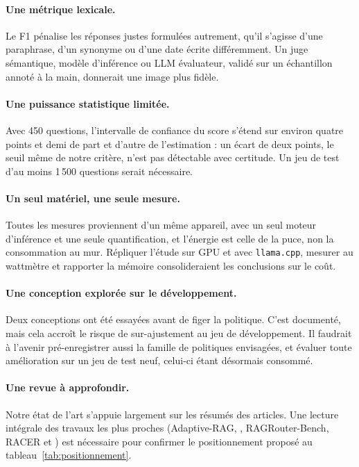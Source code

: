 \documentclass[11pt,a4paper]{article}
\begin{document}
\paragraph{Une métrique lexicale.} Le F1 pénalise les réponses justes formulées autrement, qu'il
s'agisse d'une paraphrase, d'un synonyme ou d'une date écrite différemment. Un juge sémantique, modèle
d'inférence ou LLM évaluateur, validé sur un échantillon annoté à la main, donnerait une image plus
fidèle.

\paragraph{Une puissance statistique limitée.} Avec 450 questions, l'intervalle de confiance du score
s'étend sur environ quatre points et demi de part et d'autre de l'estimation : un écart de deux points,
le seuil même de notre critère, n'est pas détectable avec certitude. Un jeu de test d'au moins 1\,500
questions serait nécessaire.

\paragraph{Un seul matériel, une seule mesure.} Toutes les mesures proviennent d'un même appareil, avec
un seul moteur d'inférence et une seule quantification, et l'énergie est celle de la puce, non la
consommation au mur. Répliquer l'étude sur GPU et avec \texttt{llama.cpp}, mesurer au wattmètre et
rapporter la mémoire consolideraient les conclusions sur le coût.

\paragraph{Une conception explorée sur le développement.} Deux conceptions ont été essayées avant de
figer la politique. C'est documenté, mais cela accroît le risque de sur-ajustement au jeu de
développement. Il faudrait à l'avenir pré-enregistrer aussi la famille de politiques envisagées, et
évaluer toute amélioration sur un jeu de test neuf, celui-ci étant désormais consommé.

\paragraph{Une revue à approfondir.} Notre état de l'art s'appuie largement sur les résumés des
articles. Une lecture intégrale des travaux les plus proches (Adaptive-RAG,
\citealp{moskvoretskii2025adaptive}, RAGRouter-Bench, RACER et \citealp{li2026beyond}) est nécessaire pour
confirmer le positionnement proposé au tableau~\ref{tab:positionnement}.
\end{document}
